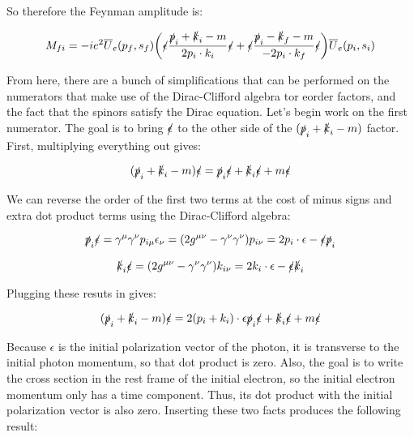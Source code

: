 \documentclass[a4]{article}
\begin{document}
    So therefore the Feynman amplitude is:

    \begin{equation}
        M_{fi} = - i e^2 \overline{U}_e (p_f, s_f) \bigg( \slashed{\epsilon} \frac{\slashed{p}_i + \slashed{k}_i - m}{2 p_i \cdot k_i} \slashed{\epsilon} + \slashed{\epsilon} \frac{\slashed{p}_i - \slashed{k}_f - m}{- 2 p_i \cdot k_f} \slashed{\epsilon} \bigg) \overline{U}_e (p_i, s_i)
    \end{equation}

    From here, there are a bunch of simplifications that can be performed on the numerators that make use of the Dirac-Clifford algebra tor eorder factors, and the fact that the spinors satisfy
    the Dirac equation. Let's begin work on the first numerator. The goal is to bring $\slashed{\epsilon}$ to the other side of the $(\slashed{p}_i + \slashed{k}_i - m)$ factor. First, multiplying
    everything out gives:

    \begin{equation}
        (\slashed{p}_i + \slashed{k}_i - m) \slashed{\epsilon} = \slashed{p}_i \slashed{\epsilon} + \slashed{k}_i \slashed{\epsilon} + m \slashed{\epsilon}
    \end{equation}

    We can reverse the order of the first two terms at the cost of minus signs and extra dot product terms using the Dirac-Clifford algebra:

    \begin{equation}
        \slashed{p}_i \slashed{\epsilon} = \gamma^{\mu} \gamma^{\nu} p_{i \mu} \epsilon_{\nu} = (2 g^{\mu \nu} - \gamma^\nu \gamma^\nu) p_{i \nu} = 2 p_i \cdot \epsilon - \slashed{\epsilon} \slashed{p}_i
    \end{equation}
    
    \begin{equation}
        \slashed{k}_i \slashed{\epsilon} = (2 g^{\mu \nu} - \gamma^\nu \gamma^\nu) k_{i \nu} = 2 k_i \cdot \epsilon - \slashed{\epsilon} \slashed{k}_i
    \end{equation}

    Plugging these resuts in gives:

    \begin{equation}
        (\slashed{p}_i + \slashed{k}_i - m) \slashed{\epsilon} = 2 (p_i + k_i) \cdot \epsilon \slashed{p}_i \slashed{\epsilon} + \slashed{k}_i \slashed{\epsilon} + m \slashed{\epsilon}
    \end{equation}

    Because $\epsilon$ is the initial polarization vector of the photon, it is transverse to the initial photon momentum, so that dot product is zero. Also, the goal is to write the cross section in
    the rest frame of the initial electron, so the initial electron momentum only has a time component. Thus, its dot product with the initial polarization vector is also zero. Inserting these two
    facts produces the following result:
\end{document}
